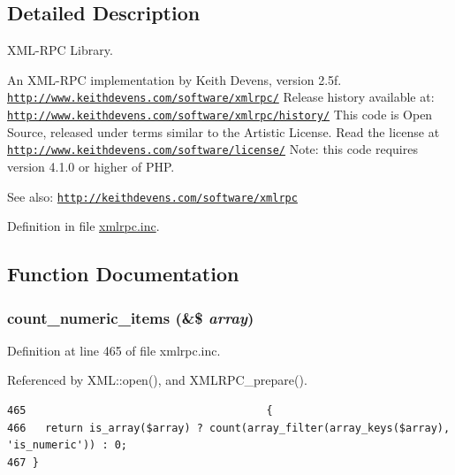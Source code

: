 \subsection{Detailed Description}
XML-RPC Library. 

An XML-RPC implementation by Keith Devens, version 2.5f. \href{http://www.keithdevens.com/software/xmlrpc/}{\tt http://www.keithdevens.com/software/xmlrpc/} Release history available at: \href{http://www.keithdevens.com/software/xmlrpc/history/}{\tt http://www.keithdevens.com/software/xmlrpc/history/} This code is Open Source, released under terms similar to the Artistic License. Read the license at \href{http://www.keithdevens.com/software/license/}{\tt http://www.keithdevens.com/software/license/} Note: this code requires version 4.1.0 or higher of PHP.

\begin{Desc}
\item[See also:]\href{http://keithdevens.com/software/xmlrpc}{\tt http://keithdevens.com/software/xmlrpc} \end{Desc}


Definition in file \hyperlink{xmlrpc_8inc-source}{xmlrpc.inc}.

\subsection{Function Documentation}
\hypertarget{xmlrpc_8inc_88839ba2c5c835c99f55578c65faa401}{
\subsubsection{\setlength{\rightskip}{0pt plus 5cm}count\_\-numeric\_\-items (\&\$ {\em array})}}
\label{xmlrpc_8inc_88839ba2c5c835c99f55578c65faa401}




Definition at line 465 of file xmlrpc.inc.

Referenced by XML::open(), and XMLRPC\_\-prepare().

\begin{Code}\begin{verbatim}465                                      {
466   return is_array($array) ? count(array_filter(array_keys($array), 'is_numeric')) : 0;
467 }
\end{verbatim}
\end{Code}




